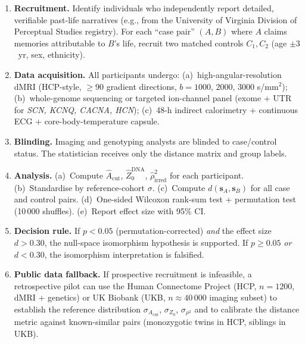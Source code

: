 \documentclass[aps,pre,twocolumn,superscriptaddress,floatfix]{revtex4-2}
\newcommand{\Acut}{A_{\text{cut}}}
\begin{document}
\begin{enumerate}
  \item \textbf{Recruitment.}\;
    Identify individuals who independently report
    detailed, verifiable past-life narratives (e.g.,
    from the University of Virginia Division of
    Perceptual Studies registry).
    For each ``case pair'' $(A,B)$ where $A$ claims
    memories attributable to $B$'s life, recruit two
    matched controls $C_1,C_2$ (age $\pm 3$~yr,
    sex, ethnicity).
  \item \textbf{Data acquisition.}\;
    All participants undergo:
    (a)~high-angular-resolution dMRI
    (HCP-style, $\ge 90$ gradient directions,
    $b=1000,\,2000,\,3000$ s/mm$^2$);
    (b)~whole-genome sequencing or targeted ion-channel
    panel (exome + UTR for \textit{SCN, KCNQ, CACNA,
    HCN});
    (c)~48-h indirect calorimetry + continuous ECG +
    core-body-temperature capsule.
  \item \textbf{Blinding.}\;
    Imaging and genotyping analysts are blinded to
    case/control status.  The statistician receives only
    the distance matrix and group labels.
  \item \textbf{Analysis.}\;
    (a)~Compute $\hat{A}_{\text{cut}}$,
    $\hat{Z}_0^{\text{DNA}}$,
    $\hat{\rho}_{\text{irred}}^2$ for each participant.
    (b)~Standardise by reference-cohort $\sigma$.
    (c)~Compute $d(\bm{s}_A,\bm{s}_B)$ for all case and
    control pairs.
    (d)~One-sided Wilcoxon rank-sum test +
    permutation test (10\,000 shuffles).
    (e)~Report effect size with 95\% CI.
  \item \textbf{Decision rule.}\;
    If $p < 0.05$ (permutation-corrected) \emph{and}
    the effect size $d > 0.30$, the null-space
    isomorphism hypothesis is supported.
    If $p \ge 0.05$ \emph{or} $d < 0.30$, the
    isomorphism interpretation is falsified.
  \item \textbf{Public data fallback.}\;
    If prospective recruitment is infeasible, a
    retrospective pilot can use the Human Connectome
    Project (HCP, $n=1200$, dMRI + genetics) or
    UK Biobank (UKB, $n\approx 40\,000$ imaging subset)
    to establish the reference distribution
    $\sigma_{\Acut}$, $\sigma_{Z_0}$,
    $\sigma_{\rho^2}$ and to calibrate the distance
    metric against known-similar pairs (monozygotic
    twins in HCP, siblings in UKB).
\end{enumerate}
\end{document}
